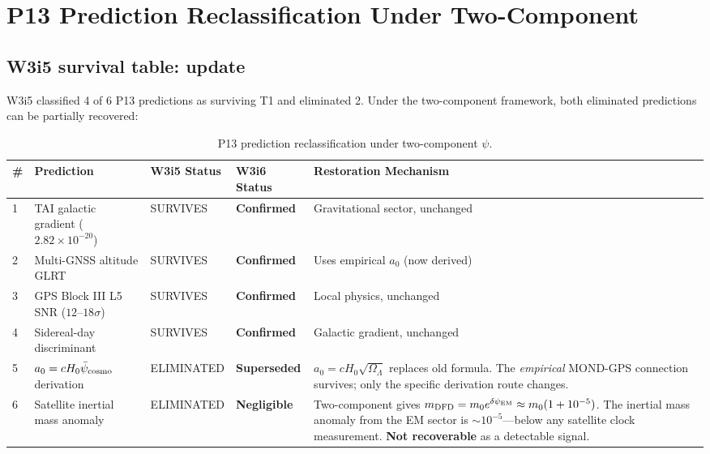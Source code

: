 \documentclass[11pt]{article}
\newcommand{\ee}[1]{\times 10^{#1}}
\newcommand{\psicosmo}{\bar{\psi}_{\rm cosmo}}
\newcommand{\dpsiEM}{\delta\psi_{\rm EM}}
\newcommand{\Hzero}{H_0}
\newcommand{\aM}{a_0}
\newcommand{\OmL}{\Omega_\Lambda}
\begin{document}
\section{P13 Prediction Reclassification Under Two-Component}
\label{sec:P13-reclass}

\subsection{W3i5 survival table: update}

W3i5 classified 4 of 6 P13 predictions as surviving T1 and eliminated 2.
Under the two-component framework, both eliminated predictions can be
partially recovered:

\begin{table}[H]
\centering
\caption{P13 prediction reclassification under two-component $\psi$.}
\label{tab:P13-reclass}
\begin{tabular}{p{0.4cm}p{3.5cm}p{2.5cm}p{2.5cm}p{3cm}}
\toprule
\# & Prediction & W3i5 Status & W3i6 Status & Restoration Mechanism \\
\midrule
1 & TAI galactic gradient ($2.82\ee{-20}$) & SURVIVES & \textbf{Confirmed} &
  Gravitational sector, unchanged \\[3pt]
2 & Multi-GNSS altitude GLRT & SURVIVES & \textbf{Confirmed} &
  Uses empirical $\aM$ (now derived) \\[3pt]
3 & GPS Block III L5 SNR ($12$--$18\sigma$) & SURVIVES & \textbf{Confirmed} &
  Local physics, unchanged \\[3pt]
4 & Sidereal-day discriminant & SURVIVES & \textbf{Confirmed} &
  Galactic gradient, unchanged \\[3pt]
5 & $\aM = c\Hzero\psicosmo$ derivation & ELIMINATED & \textbf{Superseded} &
  $\aM = c\Hzero\sqrt{\OmL}$ replaces old formula.
  The \emph{empirical} MOND-GPS connection survives; only the
  specific derivation route changes. \\[3pt]
6 & Satellite inertial mass anomaly & ELIMINATED & \textbf{Negligible} &
  Two-component gives $m_{\rm DFD} = m_0 e^{\dpsiEM}
  \approx m_0(1 + 10^{-5})$. The inertial mass anomaly from the EM
  sector is $\sim 10^{-5}$---below any satellite clock measurement.
  \textbf{Not recoverable} as a detectable signal. \\
\bottomrule
\end{tabular}
\end{table}
\end{document}
